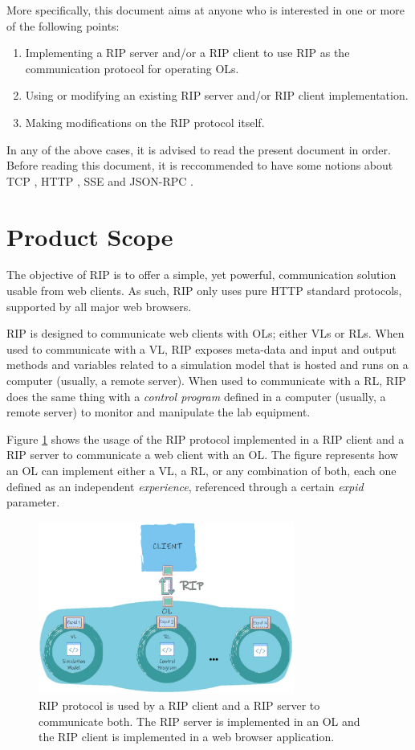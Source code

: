 More specifically, this document aims at anyone who is interested in one or more of the following points:

\begin{enumerate}
    \item Implementing a RIP server and/or a RIP client to use RIP as the communication protocol for operating OLs.
    \item Using or modifying an existing RIP server and/or RIP client implementation.
    \item Making modifications on the RIP protocol itself.
\end{enumerate}

In any of the above cases, it is advised to read the present document in order. Before reading this document, it is reccommended to have some notions about TCP \cite{tcp}, HTTP \cite{http}, SSE \cite{sse} and JSON-RPC \cite{jsonrpc}.

\section{Product Scope}
The objective of RIP is to offer a simple, yet powerful, communication solution usable from web clients. As such, RIP only uses pure HTTP standard protocols, supported by all major web browsers.

RIP is designed to communicate web clients with OLs; either VLs or RLs. When used to communicate with a VL, RIP exposes meta-data and input and output methods and variables related to a simulation model that is hosted and runs on a computer (usually, a remote server). When used to communicate with a RL, RIP does the same thing with a \textit{control program} defined in a computer (usually, a remote server) to monitor and manipulate the lab equipment.

Figure \ref{fig:Client-RIP-OL} shows the usage of the RIP protocol implemented in a RIP client and a RIP server to communicate a web client with an OL. The figure represents how an OL can implement either a VL, a RL, or any combination of both, each one defined as an independent \textit{experience}, referenced through a certain \textit{expid} parameter.

\begin{figure}
\centering
\includegraphics[width=0.75\textwidth]{images/Client-RIP-OL.pdf}
\caption{RIP protocol is used by a RIP client and a RIP server to communicate both. The RIP server is implemented in an OL and the RIP client is implemented in a web browser application.}
\label{fig:Client-RIP-OL}
\end{figure}


